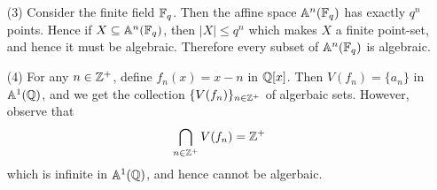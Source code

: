 \begin{example}
\begin{enumerate}
    \item[(3)] Consider the finite field $\mathbb{F}_q$. Then the affine space
      $\mathbb{A}^n(\mathbb{F}_q)$ has exactly $q^n$ points. Hence if $X \subseteq
      \mathbb{A}^n(\mathbb{F}_q)$, then $|X| \leq q^n$ which makes $X$ a finite
      point-set, and hence it must be algebraic. Therefore every
      subset of $\mathbb{A}^n(\mathbb{F}_q)$ is algebraic.

    \item[(4)] For any $n \in \mathbb{Z}^+$, define $f_n(x)=x-n$ in $\mathbb{Q}[x]$.
      Then $V(f_n)=\{a_n\}$ in $\mathbb{A}^1(\mathbb{Q})$, and we get the collection
      $\{V(f_n)\}_{n \in \mathbb{Z}^+}$ of algerbaic sets. However, observe
      that
      \begin{equation*}
        \bigcap_{n \in \mathbb{Z}^+}{V(f_n)}=\mathbb{Z}^+
      \end{equation*}
      which is infinite in $\mathbb{A}^1(\mathbb{Q})$, and hence cannot be algerbaic.
  \end{enumerate}
\end{example}

